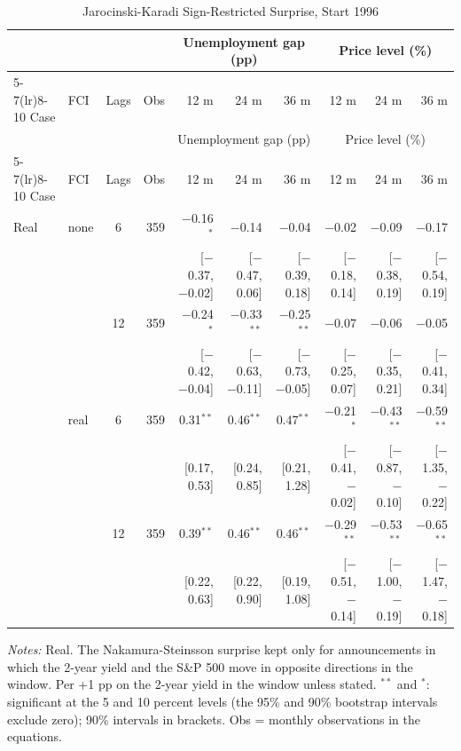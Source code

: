 \begingroup\scriptsize\setlength{\tabcolsep}{0.9pt}
\begin{longtable}{llcrrrrrrr}
\caption{Jarocinski-Karadi Sign-Restricted Surprise, Start 1996}\label{tab:appA3}\\
\toprule
 & & & & \multicolumn{3}{c}{Unemployment gap (pp)} & \multicolumn{3}{c}{Price level (\%)}\\ \cmidrule(lr){5-7}\cmidrule(lr){8-10}
Case & FCI & Lags & Obs & 12 m & 24 m & 36 m & 12 m & 24 m & 36 m\\
\midrule\endfirsthead
\toprule
 & & & & \multicolumn{3}{c}{Unemployment gap (pp)} & \multicolumn{3}{c}{Price level (\%)}\\ \cmidrule(lr){5-7}\cmidrule(lr){8-10}
Case & FCI & Lags & Obs & 12 m & 24 m & 36 m & 12 m & 24 m & 36 m\\
\midrule\endhead
\bottomrule\endfoot
Real & none & 6 & 359 & $-$0.16$^{*}$ & $-$0.14 & $-$0.04 & $-$0.02 & $-$0.09 & $-$0.17\\
 & & & & {\scriptsize [$-$0.37, $-$0.02]} & {\scriptsize [$-$0.47, 0.06]} & {\scriptsize [$-$0.39, 0.18]} & {\scriptsize [$-$0.18, 0.14]} & {\scriptsize [$-$0.38, 0.19]} & {\scriptsize [$-$0.54, 0.19]}\\
 &  & 12 & 359 & $-$0.24$^{*}$ & $-$0.33$^{**}$ & $-$0.25$^{**}$ & $-$0.07 & $-$0.06 & $-$0.05\\
 & & & & {\scriptsize [$-$0.42, $-$0.04]} & {\scriptsize [$-$0.63, $-$0.11]} & {\scriptsize [$-$0.73, $-$0.05]} & {\scriptsize [$-$0.25, 0.07]} & {\scriptsize [$-$0.35, 0.21]} & {\scriptsize [$-$0.41, 0.34]}\\
 & real & 6 & 359 & 0.31$^{**}$ & 0.46$^{**}$ & 0.47$^{**}$ & $-$0.21$^{*}$ & $-$0.43$^{**}$ & $-$0.59$^{**}$\\
 & & & & {\scriptsize [0.17, 0.53]} & {\scriptsize [0.24, 0.85]} & {\scriptsize [0.21, 1.28]} & {\scriptsize [$-$0.41, $-$0.02]} & {\scriptsize [$-$0.87, $-$0.10]} & {\scriptsize [$-$1.35, $-$0.22]}\\
 &  & 12 & 359 & 0.39$^{**}$ & 0.46$^{**}$ & 0.46$^{**}$ & $-$0.29$^{**}$ & $-$0.53$^{**}$ & $-$0.65$^{**}$\\
 & & & & {\scriptsize [0.22, 0.63]} & {\scriptsize [0.22, 0.90]} & {\scriptsize [0.19, 1.08]} & {\scriptsize [$-$0.51, $-$0.14]} & {\scriptsize [$-$1.00, $-$0.19]} & {\scriptsize [$-$1.47, $-$0.18]}\\
\end{longtable}
\begin{flushleft}\footnotesize\textit{Notes:} Real. The Nakamura-Steinsson surprise kept only for announcements in which the 2-year yield and the S\&P 500 move in opposite directions in the window. Per +1 pp on the 2-year yield in the window unless stated. $^{**}$ and $^{*}$: significant at the 5 and 10 percent levels (the 95\% and 90\% bootstrap intervals exclude zero); 90\% intervals in brackets. Obs = monthly observations in the equations.\end{flushleft}
\endgroup
